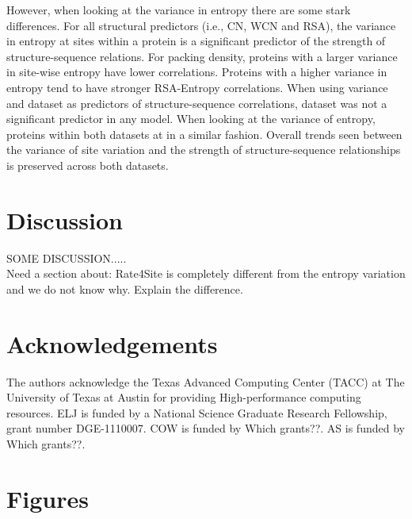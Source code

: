 \documentclass[12pt]{article}
\begin{document}
\indent However, when looking at the variance in entropy there are some stark differences. For all structural predictors (i.e., CN, WCN and RSA), the variance in entropy at sites within a protein is a significant predictor of the strength of structure-sequence relations. For packing density, proteins with a larger variance in site-wise entropy have lower correlations. Proteins with a higher variance in entropy tend to have stronger RSA-Entropy correlations. When using variance and dataset as predictors of structure-sequence correlations, dataset was not a significant predictor in any model. When looking at the variance of entropy, proteins within both datasets at in a similar fashion. Overall trends seen between the variance of site variation and the strength of structure-sequence relationships is preserved across both datasets. 

\section{Discussion}
\label{sec:dcr}
{\color{red}SOME DISCUSSION.....} \\

Need a section about:
Rate4Site is completely different from the entropy variation and we do not know why. Explain the difference. 

\section{Acknowledgements}
The authors acknowledge the Texas Advanced Computing Center (TACC) at The University of Texas at Austin for providing High-performance computing resources. ELJ is funded by a National Science Graduate Research Fellowship, grant number DGE-1110007. COW is funded by {\color{red} Which grants??}.  AS is funded by {\color{red} Which grants??}.


\cleardoublepage
\section*{Figures}
\end{document}
